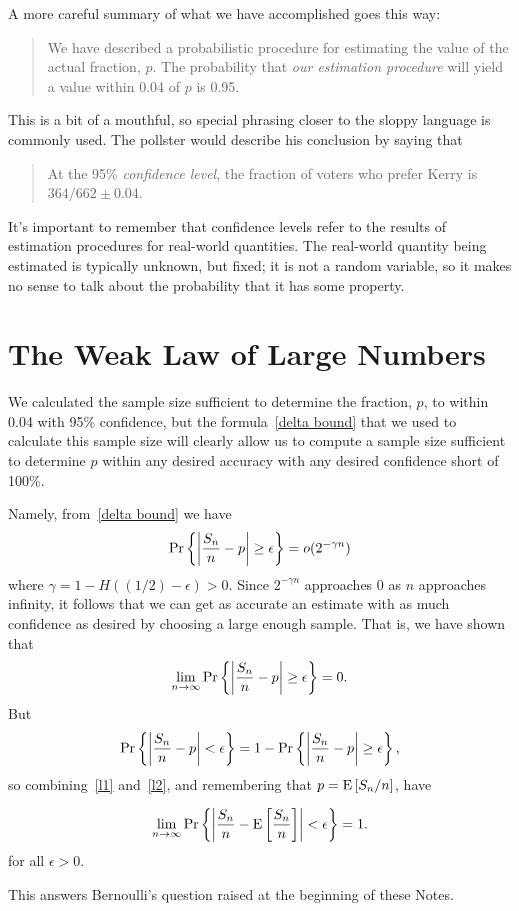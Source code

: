 \documentclass[11pt,twoside]{article}
\begin{document}
A more careful summary of what we have accomplished goes this way:
\begin{quote}
We have described a probabilistic procedure for estimating the value of
the actual fraction, $p$.  The probability that \emph{our estimation
procedure} will yield a value within 0.04 of $p$ is 0.95.
\end{quote}
This is a bit of a mouthful, so special phrasing closer to the sloppy
language is commonly used.  The pollster would describe his conclusion by
saying that
\begin{quote}
At the 95\% \emph{confidence level}, the fraction of voters
who prefer Kerry is $364/662 \pm 0.04$.
\end{quote}
It's important to remember that confidence levels refer to the results of
estimation procedures for real-world quantities.  The real-world quantity
being estimated is typically unknown, but fixed; it is not a random
variable, so it makes no sense to talk about the probability that it has
some property.

\section{The Weak Law of Large Numbers}

We calculated the sample size sufficient to determine the fraction, $p$,
to within 0.04 with 95\% confidence, but the formula~\eqref{delta bound}
that we used to calculate this sample size will clearly allow us to
compute a sample size sufficient to determine $p$ within any desired
accuracy with any desired confidence short of 100\%.

Namely, from~\eqref{delta bound} we have
\[
\mathop{\textup{Pr}}\nolimits\left\{\left|\frac{S_n}{n} - p\right| \geq \epsilon\right\} = o(2^{-\gamma n})
\]
where $\gamma= 1 - H((1/2)-\epsilon) > 0$.  Since $2^{-\gamma n}$
approaches 0 as $n$ approaches infinity, it follows that we can get as
accurate an estimate with as much confidence as desired by choosing a
large enough sample.  That is, we have shown that
\begin{equation}\label{l1}
\lim_{n \to \infty} \mathop{\textup{Pr}}\nolimits\left\{\left|\frac{S_n}{n} - p\right| \geq \epsilon\right\} = 0.
\end{equation}
But
\begin{equation}\label{l2}
\mathop{\textup{Pr}}\nolimits\left\{\left|\frac{S_n}{n} - p\right| < \epsilon\right\} = 1 - \mathop{\textup{Pr}}\nolimits\left\{\left|\frac{S_n}{n} - p\right| \geq \epsilon\right\},
\end{equation}
so combining~\eqref{l1} and~\eqref{l2}, and remembering that
$p=\mathop{\textup{E}}\nolimits\left[S_n/n\right]$, have
\begin{corollary}
\label{law}
\[
\lim_{n \to \infty} \mathop{\textup{Pr}}\nolimits\left\{\left|\frac{S_n}{n} - \mathop{\textup{E}}\nolimits\left[\frac{S_n}{n}\right]\right| <
\epsilon\right\} = 1.
\]
for all $\epsilon >0$.
\end{corollary}
This answers Bernoulli's question raised at the beginning of these Notes.
\end{document}
